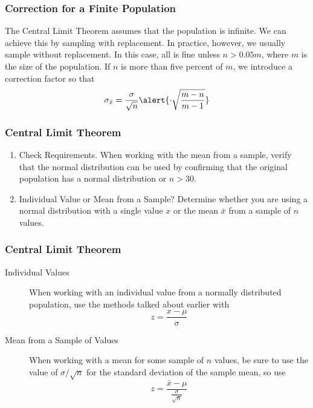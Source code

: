 \documentclass[xcolor=dvipsnames]{beamer}
\begin{document}
\begin{frame}
  \frametitle{Correction for a Finite Population}
The Central Limit Theorem assumes that the population is infinite. We
can achieve this by sampling with replacement. In practice, however,
we usually sample without replacement. In this case, all is fine
unless $n>0.05m$, where $m$ is the size of the population. If $n$ is
more than five percent of $m$, we introduce a correction factor so
that
\begin{equation}
  \label{eq:ungeihay}
  \sigma_{\bar{x}}=\frac{\sigma}{\sqrt{n}}\alert{\cdot\sqrt{\frac{m-n}{m-1}}}
\end{equation}

\end{frame}

\begin{frame}
  \frametitle{Central Limit Theorem}
\begin{enumerate}
\item Check Requirements. When working with the mean from a sample,
  verify that the normal distribution can be used by confirming that
  the original population has a normal distribution or $n>30$. 
\item Individual Value or Mean from a Sample? Determine whether you
  are using a normal distribution with a single value $x$ or the mean
  $\bar{x}$ from a sample of $n$ values. 
\end{enumerate}
\end{frame}

\begin{frame}
  \frametitle{Central Limit Theorem}
\begin{description}
\item[Individual Values] When working with an individual value from a
  normally distributed population, use the methods talked about
  earlier with 
  \begin{equation}
    \label{eq:cohseiph}
    z=\frac{x-\mu}{\sigma}
  \end{equation}
\item[Mean from a Sample of Values] When working with a mean for some
  sample of $n$ values, be sure to use the value of $\sigma/\sqrt{n}$
  for the standard deviation of the sample mean, so use
  \begin{equation}
    \label{eq:euruighu}
    z=\frac{\bar{x}-\mu}{\frac{\sigma}{\sqrt{n}}}
  \end{equation}
\end{description}
\end{frame}
\end{document}
